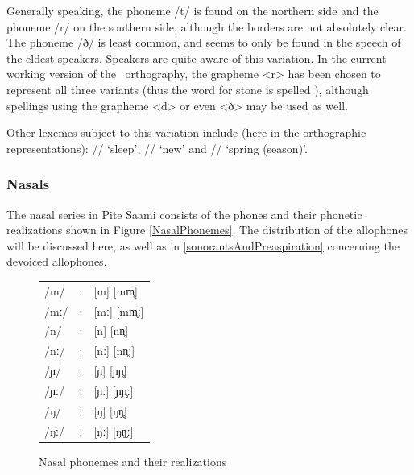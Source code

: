 Generally speaking, the phoneme /t/ is found on the northern side and the phoneme /r/ on the southern side, although the borders are not absolutely clear. The phoneme /ð/ is least common, and seems to only be found in the speech of the eldest speakers.   
Speakers are quite aware of this variation. 
In the current working version of the \PS\ orthography, the grapheme <r> has been chosen to represent all three variants (thus the word for stone is spelled ), although spellings using the grapheme <d> or even <ð> may be used as well. 

Other lexemes subject to this variation include (here in the orthographic representations): 
// ‘sleep’, 
// ‘new’ and 
//  ‘spring (season)’. 



\FB

\subsubsection{Nasals}\label{Nasals}%
The nasal series in Pite Saami consists of the phones and their phonetic realizations shown in Figure \vref{NasalPhonemes}. The distribution of the allophones will be discussed here, as well as in \SEC\ref{sonorantsAndPreaspiration} concerning the devoiced allophones. 
\begin{figure}[h]\centering
\begin{tabular}{l c l}
/m/ &:& [m] [mm̥] \\ %
/mː/ &:& [mː] [mm̥ː] \\ %
/n/ &:& [n] [nn̥] \\ %
/nː/ &:& [nː] [nn̥ː]\\ %
/ɲ/ &:& [ɲ] [ɲɲ̥]\\ %
/ɲː/ &:& [ɲː] [ɲɲ̥ː]\\ %
/ŋ/ &:& [ŋ] [ŋŋ̥]\\ %
/ŋː/ &:& [ŋː] [ŋŋ̥ː]\\ %
\end{tabular}
\caption{Nasal phonemes and their realizations}\label{NasalPhonemes}
\end{figure}

